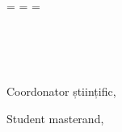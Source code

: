 \begin{titlepage}
  \oddsidemargin=\evensidemargin\relax
  \textwidth=\dimexpr{}\evensidemargin-2in\relax
  \hsize=\textwidth\relax

  \centering

  \begin{flushright}
  {%
    \vspace*{10mm}
  }
  \end{flushright}

  \vspace{5mm}
  {\LARGE{\getUniversity{}}}\\
  
  \vspace{5mm}
  {\LARGE{\getFaculty{}}}\\
  
  \vspace{5mm}
  {\LARGE{\getDepartment{}}}\\

  \vfill
  {\huge\bfseries \getDoctype}

  \vfill
  \begin{flushleft}
  {\large Coordonator științific,}\\
  {\large \getAdvisor{}}
  \end{flushleft}

  \vspace{5mm}
  \begin{flushright}
  {\large Student masterand,}\\
  {\large \getAuthor{}}
  \end{flushright}


  \vfill
  {\huge{\getSubmissionLocation{}}}\\
  
  \vspace{5mm}
  {\huge{\getSubmissionDate}{}}\\

\end{titlepage}
